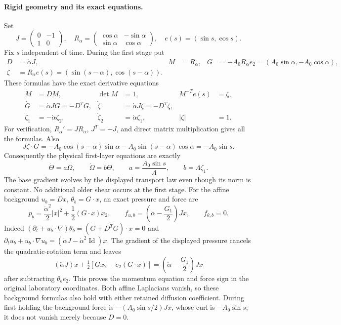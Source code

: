 \documentclass[11pt]{article}
\newcommand{\Id}{\operatorname{Id}}
\begin{document}
\paragraph{Rigid geometry and its exact equations.}
Set
\[
J=\begin{pmatrix}0&-1\\1&0\end{pmatrix},\quad
R_\alpha=\begin{pmatrix}\cos\alpha&-\sin\alpha\\
\sin\alpha&\cos\alpha\end{pmatrix},\quad
e(s)=(\sin s,\cos s).
\]
Fix $s$ independent of time. During the first stage put
\begin{align}
 D&=\dot\alpha J,& M&=R_\alpha,&
 G&=-A_0R_\alpha e_2=(A_0\sin\alpha,-A_0\cos\alpha),\\
 \zeta&=R_\alpha e(s)=(\sin(s-\alpha),\cos(s-\alpha)).
\end{align}
These formulas have the exact derivative equations
\begin{align}
 \dot M&=DM,& \det M&=1,& M^{-T}e(s)&=\zeta,\\
 \dot G&=\dot\alpha JG=-D^TG,&
 \dot\zeta&=\dot\alpha J\zeta=-D^T\zeta,\\
 \dot\zeta_1&=-\dot\alpha\zeta_2,&
 \dot\zeta_2&=\dot\alpha\zeta_1,& |\zeta|&=1.
\end{align}
For verification, $R_\alpha'=JR_\alpha$, $J^T=-J$, and direct
matrix multiplication gives all the formulas. Also
\[
 J\zeta\cdot G
=-A_0\cos(s-\alpha)\sin\alpha
 -A_0\sin(s-\alpha)\cos\alpha=-A_0\sin s.
\]
Consequently the physical first-layer equations are exactly
\begin{equation}\label{eq:physical}
 \dot\Theta=a\Omega,\qquad\dot\Omega=b\Theta,\qquad
 a=\frac{A_0\sin s}{\Lambda},\qquad b=\Lambda\zeta_1.
\end{equation}
The base gradient evolves by the displayed transport law even though its
norm is constant. No additional older shear occurs at the first stage.
For the affine background $u_b=Dx$, $\theta_b=G\cdot x$, an exact
pressure and force are
\[
 p_b=\frac{\dot\alpha^2}{2}|x|^2+\frac12(G\cdot x)x_2,
 \qquad f_{u,b}=\left(\ddot\alpha-\frac{G_1}{2}\right)Jx,
 \qquad f_{\theta,b}=0.
\]
Indeed $(\partial_t+u_b\cdot\nabla)\theta_b
=(\dot G+D^TG)\cdot x=0$ and
$\partial_tu_b+u_b\cdot\nabla u_b=(\ddot\alpha J-\dot\alpha^2\Id)x$.
The gradient of the displayed pressure cancels the quadratic-rotation
term and leaves
\[
 (\ddot\alpha J)x+\tfrac12[Gx_2-e_2(G\cdot x)]
 =\left(\ddot\alpha-\frac{G_1}{2}\right)Jx
\]
after subtracting $\theta_be_2$. This proves the momentum equation
and force sign in the original laboratory coordinates.
Both affine Laplacians vanish, so these background formulas also hold
with either retained diffusion coefficient. During first holding the
background force is $-(A_0\sin s/2)Jx$, whose curl is
$-A_0\sin s$; it does not vanish merely because $D=0$.
\end{document}
